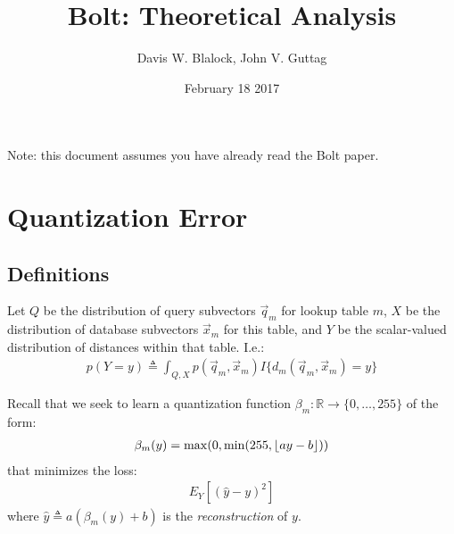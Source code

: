 \documentclass[]{article}
\begin{document}
\title{Bolt: Theoretical Analysis}

\author{Davis W. Blalock, John V. Guttag}



\date{\Large February 18 2017}
\maketitle

Note: this document assumes you have already read the Bolt paper.

\section{Quantization Error}

\subsection{Definitions}

Let $Q$ be the distribution of query subvectors $\vec{q}_m$ for lookup table $m$, $X$ be the distribution of database subvectors $\vec{x}_m$ for this table, and $Y$ be the scalar-valued distribution of distances within that table. I.e.:
\begin{align}
    p(Y = y) \triangleq \int_{Q, X} p(\vec{q}_m, \vec{x}_m)I\{d_m(\vec{q}_m, \vec{x}_m) = y\}
\end{align}

Recall that we seek to learn a quantization function $\beta_m: \mathbb{R} \rightarrow \{0,\ldots,255\}$ of the form:
\begin{align}
    \beta_m(y) = \max(0, \min(255, \floor*{ay - b}))
\end{align}
\noindent that minimizes the loss:
\begin{align}
    E_Y[(\hat{y} - y)^2]
\end{align}
where $\hat{y} \triangleq a(\beta_m(y) + b)$ is the \textit{reconstruction} of $y$.
\end{document}

